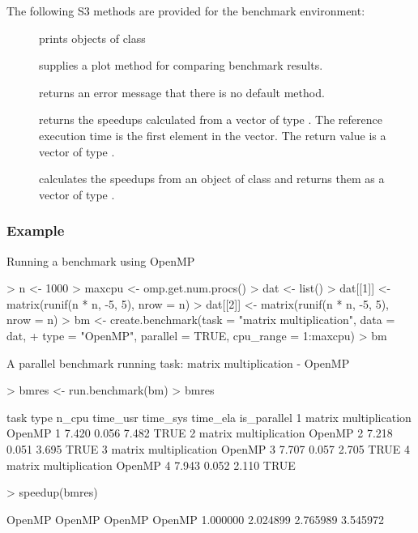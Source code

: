 \begin{Example}
The following S3 methods are provided for the benchmark environment:

\begin{description}
\item[] prints objects of class 
\item[] supplies a plot method for comparing
  benchmark results.
\item[] returns an error message that there is
  no default method. 
\item[] returns the speedups calculated from a
  vector of type . The reference execution time is  the
  first element in the vector. The return value is a vector of type
  . 
\item[] calculates the speedups from an object
  of class  and returns them as a vector of type
  . 
\end{description}

\subsubsection{Example}

\begin{Example} Running a benchmark using OpenMP
\label{ex:benchrun}
\begin{Schunk}
\begin{Sinput}
> n <- 1000
> maxcpu <- omp.get.num.procs()
> dat <- list()
> dat[[1]] <- matrix(runif(n * n, -5, 5), nrow = n)
> dat[[2]] <- matrix(runif(n * n, -5, 5), nrow = n)
> bm <- create.benchmark(task = "matrix multiplication", data = dat, 
+     type = "OpenMP", parallel = TRUE, cpu_range = 1:maxcpu)
> bm
\end{Sinput}
\begin{Soutput}
A parallel benchmark running task: matrix multiplication - OpenMP
\end{Soutput}
\begin{Sinput}
> bmres <- run.benchmark(bm)
> bmres
\end{Sinput}
\begin{Soutput}
                   task   type n_cpu time_usr time_sys time_ela is_parallel
1 matrix multiplication OpenMP     1    7.420    0.056    7.482        TRUE
2 matrix multiplication OpenMP     2    7.218    0.051    3.695        TRUE
3 matrix multiplication OpenMP     3    7.707    0.057    2.705        TRUE
4 matrix multiplication OpenMP     4    7.943    0.052    2.110        TRUE
\end{Soutput}
\begin{Sinput}
> speedup(bmres)
\end{Sinput}
\begin{Soutput}
  OpenMP   OpenMP   OpenMP   OpenMP 
1.000000 2.024899 2.765989 3.545972 
\end{Soutput}
\end{Schunk}
\end{Example}


\end{Example}
